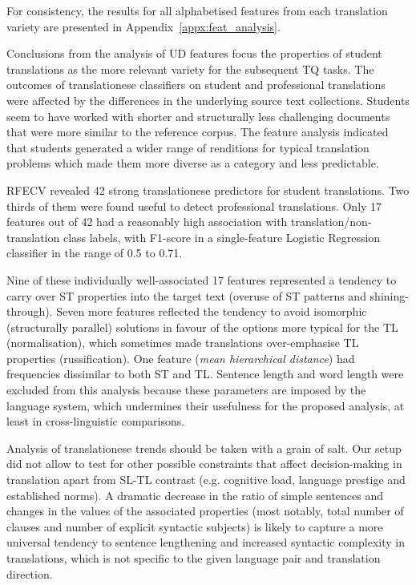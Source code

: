 For consistency, the results for all alphabetised features from each translation variety are presented in Appendix~\ref{appx:feat_analysis}.  

Conclusions from the analysis of UD features focus the properties of student translations as the more relevant variety for the subsequent TQ tasks. The outcomes of translationese classifiers on student and professional translations were affected by the differences in the underlying source text collections. Students seem to have worked with shorter and structurally less challenging documents that were more similar to the reference corpus. 
The feature analysis indicated that students generated a wider range of renditions for typical translation problems which made them more diverse as a category and less predictable.

RFECV revealed 42 strong translationese predictors for student translations. Two thirds of them were found useful to detect professional translations. Only 17 features out of 42 had a reasonably high association with translation/non-translation class labels, with F1-score in a single-feature Logistic Regression classifier in the range of 0.5 to 0.71. 

Nine of these individually well-associated 17 features represented a tendency to carry over ST properties into the target text (overuse of ST patterns and shining-through). Seven more features reflected the tendency to avoid isomorphic (structurally parallel) solutions in favour of the options more typical for the TL (normalisation), which sometimes made translations over-emphasise TL properties (russification). One feature (\textit{mean hierarchical distance}) had frequencies dissimilar to both ST and TL.
Sentence length and word length were excluded from this analysis because these parameters are imposed by the language system, which undermines their usefulness for the proposed analysis, at least in cross-linguistic comparisons.

Analysis of translationese trends should be taken with a grain of salt. Our setup did not allow to test for other possible constraints that affect decision-making in translation apart from SL-TL contrast (e.g. cognitive load, language prestige and established norms). A dramatic decrease in the ratio of simple sentences and changes in the values of the associated properties (most notably, total number of clauses and number of explicit syntactic subjects) is likely to capture a more universal tendency to sentence lengthening and increased syntactic complexity in translations, which is not specific to the given language pair and translation direction. 

